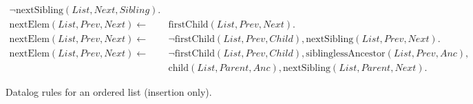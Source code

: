 \documentclass[twocolumn,10pt]{article}
\begin{document}
\begin{figure*}
\begin{align*}
    \neg\mathrm{nextSibling}(\mathit{List}, \mathit{Next}, \mathit{Sibling}).
\\
    \mathrm{nextElem}(\mathit{List}, \mathit{Prev}, \mathit{Next}) \leftarrow\; &
    \mathrm{firstChild}(\mathit{List}, \mathit{Prev}, \mathit{Next}).
\\
    \mathrm{nextElem}(\mathit{List}, \mathit{Prev}, \mathit{Next}) \leftarrow\; &
    \neg\mathrm{firstChild}(\mathit{List}, \mathit{Prev}, \mathit{Child}),
    \mathrm{nextSibling}(\mathit{List}, \mathit{Prev}, \mathit{Next}).
\\
    \mathrm{nextElem}(\mathit{List}, \mathit{Prev}, \mathit{Next}) \leftarrow\; &
    \neg\mathrm{firstChild}(\mathit{List}, \mathit{Prev}, \mathit{Child}),
    \mathrm{siblinglessAncestor}(\mathit{List}, \mathit{Prev}, \mathit{Anc}), \\&
    \mathrm{child}(\mathit{List}, \mathit{Parent}, \mathit{Anc}),
    \mathrm{nextSibling}(\mathit{List}, \mathit{Parent}, \mathit{Next}).
\end{align*}
\caption{Datalog rules for an ordered list (insertion only).}
\end{figure*}

{\footnotesize

{}}
\end{document}
